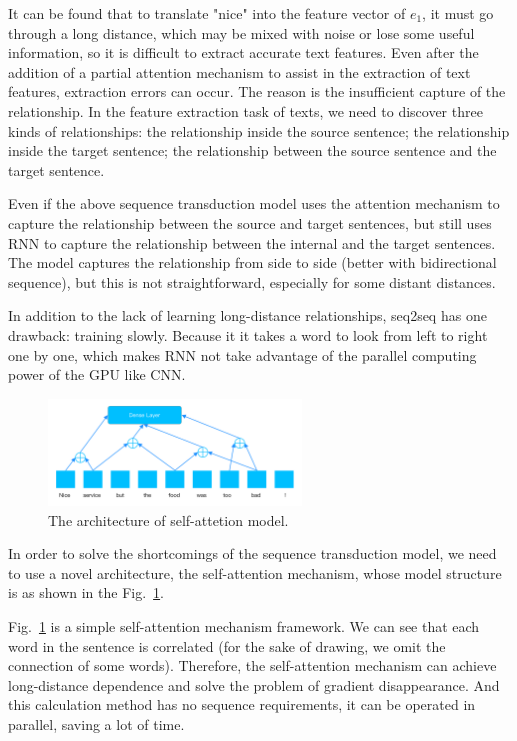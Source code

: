 \documentclass[runningheads, twocolumn]{llncs}
\begin{document}
It can be found that to translate "nice" into the feature vector of $e_1$, it must go through a long distance, which may be mixed with noise or lose some useful information, so it is difficult to extract accurate text features. Even after the addition of a partial attention mechanism to assist in the extraction of text features, extraction errors can occur. The reason is the insufficient capture of the relationship. In the feature extraction task of texts, we need to discover three kinds of relationships: the relationship inside the source sentence; the relationship inside the target sentence; the relationship between the source sentence and the target sentence.

Even if the above sequence transduction model uses the attention mechanism to capture the relationship between the source and target sentences, but still uses RNN to capture the relationship between the internal and the target sentences. The model captures the relationship from side to side (better with bidirectional sequence), but this is not straightforward, especially for some distant distances.

In addition to the lack of learning long-distance relationships, seq2seq has one drawback: training slowly. Because it it takes a word to look from left to right one by one, which makes RNN not take advantage of the parallel computing power of the GPU like CNN.

\begin{figure}[htb]
	\includegraphics[width=0.6\textwidth]{self-attention2.png}
	\centering
	\caption{The architecture of self-attetion model.}\label{self-attention}
\end{figure}

In order to solve the shortcomings of the sequence transduction model, we need to use a novel architecture, the self-attention mechanism, whose model structure is as shown in the Fig.~\ref{self-attention}. 

Fig.~\ref{self-attention} is a simple self-attention mechanism framework. We can see that each word in the sentence is correlated (for the sake of drawing, we omit the connection of some words). Therefore, the self-attention mechanism can achieve long-distance dependence and solve the problem of gradient disappearance. And this calculation method has no sequence requirements, it can be operated in parallel, saving a lot of time.
\end{document}
